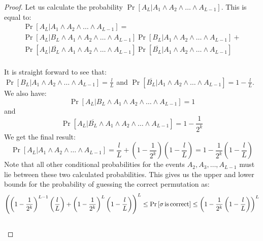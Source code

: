 \documentclass{llncs}
\begin{document}
\begin{proof}
Let us calculate the probability $\Pr \left[ {A_L |A_1  \wedge A_2  \wedge  \ldots  \wedge A_{L - 1} } \right]$. This is equal to:
\[
\begin{array}{l}
 \Pr \left[ {A_L |A_1  \wedge A_2  \wedge  \ldots  \wedge A_{L - 1} } \right] =\\
  \Pr \left[ {A_L |B_L  \wedge A_1  \wedge A_2  \wedge  \ldots  \wedge A_{L - 1} } \right]\Pr \left[ {B_L |A_1  \wedge A_2  \wedge  \ldots  \wedge A_{L - 1} } \right] + \\ 
 \Pr \left[ {A_L |\overline {B_L }  \wedge A_1  \wedge A_2  \wedge  \ldots  \wedge A_{L - 1} } \right]\Pr \left[ {\overline {B_L } |A_1  \wedge A_2  \wedge  \ldots  \wedge A_{L - 1} } \right] \\ 
 \end{array}
\]

It is straight forward to see that:\\
$\Pr \left[ {B_L |A_1  \wedge A_2  \wedge  \ldots  \wedge A_{L - 1} } \right] = \frac{l}{L}$ and $\Pr \left[ {\overline {B_L } |A_1  \wedge A_2  \wedge  \ldots  \wedge A_{L - 1} } \right] = 1 - \frac{l}{L}$. We also have:
\[
\Pr \left[ {A_L |B_L  \wedge A_1  \wedge A_2  \wedge  \ldots  \wedge A_{L - 1} } \right] = 1
\]
and
\[
\Pr \left[ {A_L |\overline {B_L }  \wedge A_1  \wedge A_2  \wedge  \ldots  \wedge A_{L - 1} } \right] = 1 - \frac{1}{{2^k }}
\]
We get the final result:
\[
\Pr \left[ {A_L |A_1  \wedge A_2  \wedge  \ldots  \wedge A_{L - 1} } \right] = \frac{l}{L} + \left( {1 - \frac{1}{{2^k }}} \right)\left( {1 - \frac{l}{L}} \right) = 1 - \frac{1}{{2^k }}\left( {1 - \frac{l}{L}} \right)
\]
Note that all other conditional probabilities for the events $A_2 ,A_3 , \ldots ,A_{L - 1}$ must lie between these two calculated probabilities. This gives us the upper and lower bounds for the probability of guessing the correct permutation as:
\[
\left( {\left( {1 - \frac{1}{{2^k }}} \right)^{L - 1} \left( {\frac{l}{L}} \right) + \left( {1 - \frac{1}{{2^k }}} \right)^L \left( {1 - \frac{l}{L}} \right)} \right)^L  \le \Pr \left[ {\sigma \,{\rm{is}}\,{\rm{correct}}} \right] \le \left( {1 - \frac{1}{{2^k }}\left( {1 - \frac{l}{L}} \right)} \right)^L 
\]\\
 
\end{proof}
\end{document}
